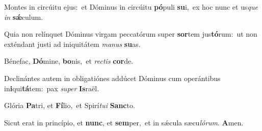 Montes in circúitu ejus:~\reddagger et Dóminus in circúitu \textbf{pó}puli \textbf{su}i,~\redgreheightstar ex hoc nunc et us\textit{que} \textit{in} \textbf{sǽ}culum.

Quia non relínquet Dóminus virgam peccatórum super \textbf{sor}tem jus\textbf{tó}rum:~\redgreheightstar ut non exténdant justi ad iniquitátem \textit{ma}\textit{nus} \textbf{su}as.

Bénefac, \textbf{Dó}mine, \textbf{bo}nis,~\redgreheightstar et \textit{rec}\textit{tis} \textbf{cor}de.

Declinántes autem in obligatiónes addúcet Dóminus cum operántibus in\textbf{i}qui\textbf{tá}tem:~\redgreheightstar pax \textit{su}\textit{per} \textbf{Is}raël.

Glória \textbf{Pa}tri, et \textbf{Fí}lio,~\redgreheightstar et Spirí\textit{tu}\textit{i} \textbf{Sanc}to.

Sicut erat in princípio, et \textbf{nunc}, et \textbf{sem}per,~\redgreheightstar et in sǽcula sæcu\textit{ló}\textit{rum}. \textbf{A}men.

